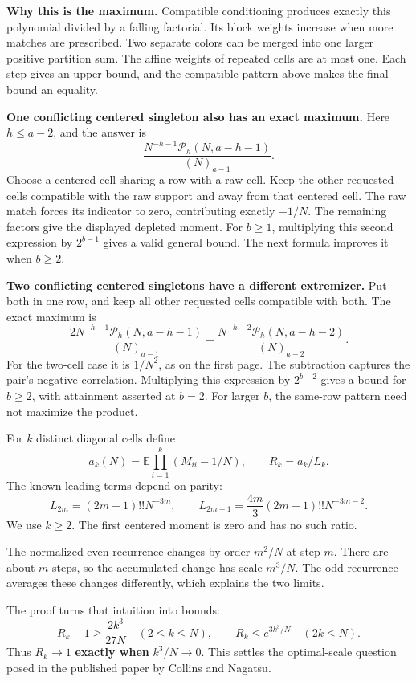\documentclass[11pt]{article}
\newcommand{\E}{\mathbb E}
\newcommand{\pagetitle}[2]{\noindent{\small\sffamily\color{teal}#1}\par\vspace{5pt}\noindent{\LARGE\bfseries\color{ink}#2}\par\vspace{12pt}}
\begin{document}
\textbf{Why this is the maximum.} Compatible conditioning produces exactly this polynomial divided by a falling factorial. Its block weights increase when more matches are prescribed. Two separate colors can be merged into one larger positive partition sum. The affine weights of repeated cells are at most one. Each step gives an upper bound, and the compatible pattern above makes the final bound an equality.

\textbf{One conflicting centered singleton also has an exact maximum.} Here $h\le a-2$, and the answer is
\[
\boxed{\frac{N^{-h-1}\mathcal P_h(N,a-h-1)}{(N)_{a-1}}.}
\]
Choose a centered cell sharing a row with a raw cell. Keep the other requested cells compatible with the raw support and away from that centered cell. The raw match forces its indicator to zero, contributing exactly $-1/N$. The remaining factors give the displayed depleted moment. For $b\ge1$, multiplying this second expression by $2^{b-1}$ gives a valid general bound. The next formula improves it when $b\ge2$.

\textbf{Two conflicting centered singletons have a different extremizer.} Put both in one row, and keep all other requested cells compatible with both. The exact maximum is
\[
\frac{2N^{-h-1}\mathcal P_h(N,a-h-1)}{(N)_{a-1}}
-\frac{N^{-h-2}\mathcal P_h(N,a-h-2)}{(N)_{a-2}}.
\]
For the two-cell case it is $1/N^2$, as on the first page. The subtraction captures the pair's negative correlation. Multiplying this expression by $2^{b-2}$ gives a bound for $b\ge2$, with attainment asserted at $b=2$. For larger $b$, the same-row pattern need not maximize the product.

\newpage
\pagetitle{THE FIRST TRANSITION}{Why the order enters as a cube}

For $k$ distinct diagonal cells define
\[
a_k(N)=\E\prod_{i=1}^k(M_{ii}-1/N),\qquad R_k=a_k/L_k.
\]
The known leading terms depend on parity:
\[
L_{2m}=(2m-1)!!N^{-3m},\qquad
L_{2m+1}=\frac{4m}{3}(2m+1)!!N^{-3m-2}.
\]
We use $k\ge2$. The first centered moment is zero and has no such ratio.

The normalized even recurrence changes by order $m^2/N$ at step $m$. There are about $m$ steps, so the accumulated change has scale $m^3/N$. The odd recurrence averages these changes differently, which explains the two limits.

The proof turns that intuition into bounds:
\[
R_k-1\ge\frac{2k^3}{27N}\quad(2\le k\le N),\qquad
R_k\le e^{3k^3/N}\quad(2k\le N).
\]
Thus $R_k\to1$ \textbf{exactly when} $k^3/N\to0$. This settles the optimal-scale question posed in the published paper by Collins and Nagatsu.
\end{document}
